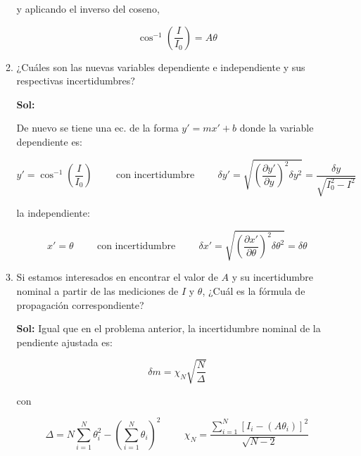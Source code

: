 \documentclass[12pt,a4paper]{article}
\begin{document}
\begin{enumerate}
\begin{enumerate}
    y aplicando el inverso del coseno,
    
    \begin{equation*}
        \cos^{-1}{\left(\frac{I}{I_0}\right)} = A \theta
    \end{equation*}
    
    \item ¿Cuáles son las nuevas variables dependiente e independiente y sus respectivas incertidumbres?
    
    \textbf{Sol:}
    
    De nuevo se tiene una ec. de la forma $y' =m x' +b$ donde la variable dependiente es:
    
    \begin{equation*}
        y' = \cos^{-1}{\left(\frac{I}{I_0}\right)}  \hspace{1cm} \text{con incertidumbre} \hspace{1cm} \delta y' =\sqrt{ \left(\frac{\partial y'}{\partial y}\right)^2 \delta y^2 }= \frac{\delta y}{\sqrt{I_{0}^{2} - I ^2}}
    \end{equation*}
    
    la independiente:
    
    \begin{equation*}
        x' = \theta \hspace{1cm} \text{con incertidumbre} \hspace{1cm} \delta x' = \sqrt{\left(\frac{\partial x'}{\partial \theta}\right)^2 \delta \theta^2} = \delta \theta
    \end{equation*}
    
    
    \item Si estamos interesados en encontrar el valor de $A$ y su incertidumbre nominal a partir de las mediciones de $I$ y $\theta$, ¿Cuál es la fórmula de propagación correspondiente? 
    
    \textbf{Sol:}
    Igual que en el problema anterior, la incertidumbre nominal de la pendiente ajustada es:
    
    \begin{equation*}
        \delta m = \chi_N \sqrt{\frac{N}{\Delta}}
    \end{equation*}
    
    con 
    
    \begin{equation*}
        \Delta  = N \sum_{i=1}^{N} \theta_{i}^{2} - \left(\sum_{i=1}^{N} \theta_i\right)^2 \hspace{1cm} \chi_N = \frac{\sum_{i=1}^{N} [I_i - (A\theta_i)]^2}{\sqrt{N-2}}
    \end{equation*}
    

\end{enumerate}
\end{enumerate}
\end{document}
